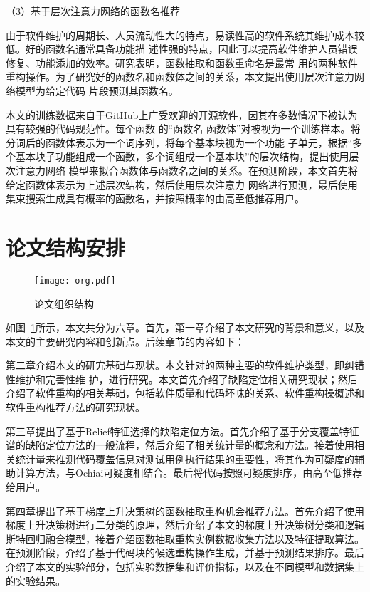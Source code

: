 （3）基于层次注意力网络的函数名推荐

由于软件维护的周期长、人员流动性大的特点，易读性高的软件系统其维护成本较低。好的函数名通常具备功能描
述性强的特点，因此可以提高软件维护人员错误修复、功能添加的效率。研究表明，函数抽取和函数重命名是最常
用的两种软件重构操作。为了研究好的函数名和函数体之间的关系，本文提出使用层次注意力网络模型为给定代码
片段预测其函数名。

本文的训练数据来自于GitHub上广受欢迎的开源软件，因其在多数情况下被认为具有较强的代码规范性。每个函数
的``函数名-函数体''对被视为一个训练样本。将分词后的函数体表示为一个词序列，将每个基本块视为一个功能
子单元，根据``多个基本块子功能组成一个函数，多个词组成一个基本块''的层次结构，提出使用层次注意力网络
模型来拟合函数体与函数名之间的关系。在预测阶段，本文首先将给定函数体表示为上述层次结构，然后使用层次注意力
网络进行预测，最后使用集束搜索生成具有概率的函数名，并按照概率的由高至低推荐用户。

\section{论文结构安排}
\begin{figure}[htp]
  \centering
  \texttt{[image: org.pdf]}
  \caption{论文组织结构}
  \label{fig:org}
\end{figure}

如图~\ref{fig:org}所示，本文共分为六章。首先，第一章介绍了本文研究的背景和意义，以及本文的主要研究内容和创新点。后续章节的内容如下：  

第二章介绍本文的研宄基础与现状。本文针对的两种主要的软件维护类型，即纠错性维护和完善性维
护，进行研究。本文首先介绍了缺陷定位相关研究现状；然后介绍了软件重构的相关基础，包括软件质量和代码坏味的关系、软件重构操概述和软件重构推荐方法的研究现状。

第三章提出了基于Relief特征选择的缺陷定位方法。首先介绍了基于分支覆盖特征谱的缺陷定位方法的一般流程，然后介绍了相关统计量的概念和方法。接着使用相关统计量来推测代码覆盖信息对测试用例执行结果的重要性，将其作为可疑度的辅助计算方法，与Ochiai可疑度相结合。最后将代码按照可疑度排序，由高至低推荐给用户。

第四章提出了基于梯度上升决策树的函数抽取重构机会推荐方法。首先介绍了使用梯度上升决策树进行二分类的原理，然后介绍了本文的梯度上升决策树分类和逻辑斯特回归融合模型，接着介绍函数抽取重构实例数据收集方法以及特征提取算法。在预测阶段，介绍了基于代码块的候选重构操作生成，并基于预测结果排序。最后介绍了本文的实验部分，包括实验数据集和评价指标，以及在不同模型和数据集上的实验结果。

